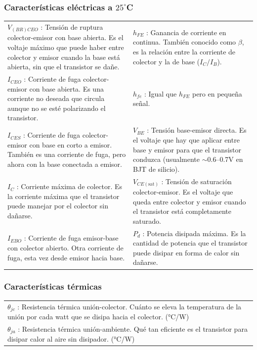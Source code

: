 \documentclass[chaptersright]{informeutn}
\begin{document}
\subsubsection{Características eléctricas a $25^\circ$C }

\begin{tabular}{p{7cm} p{7cm}}
    $V_{(BR)CEO}$ : Tensión de ruptura colector-emisor con base abierta. Es el voltaje máximo que puede haber entre colector y emisor cuando la base está abierta, sin que el transistor se dañe. &
    $h_{FE}$ : Ganancia de corriente en continua. También conocido como $\beta$, es la relación entre la corriente de colector y la de base ($I_C/I_B$). \\
    
    $I_{CEO}$ : Corriente de fuga colector-emisor con base abierta. Es una corriente no deseada que circula aunque no se esté polarizando el transistor. &
    $h_{fe}$ : Igual que $h_{FE}$ pero en pequeña señal. \\
    
    $I_{CES}$ : Corriente de fuga colector-emisor con base en corto a emisor. También es una corriente de fuga, pero ahora con la base conectada a emisor. &
    $V_{BE}$ : Tensión base-emisor directa. Es el voltaje que hay que aplicar entre base y emisor para que el transistor conduzca (usualmente $\sim$0.6–0.7V en BJT de silicio). \\
    
    $I_C$ : Corriente máxima de colector. Es la corriente máxima que el transistor puede manejar por el colector sin dañarse. &
    $V_{CE(\text{sat})}$ : Tensión de saturación colector-emisor. Es el voltaje que queda entre colector y emisor cuando el transistor está completamente saturado. \\
    
    $I_{EBO}$ : Corriente de fuga emisor-base con colector abierto. Otra corriente de fuga, esta vez desde emisor hacia base. &
    $P_d$ : Potencia disipada máxima. Es la cantidad de potencia que el transistor puede disipar en forma de calor sin dañarse. \\
\end{tabular}

\vspace{1em}
\subsubsection{Características térmicas}

\begin{tabular}{p{14cm}}
    $\theta_{jc}$ : Resistencia térmica unión-colector. Cuánto se eleva la temperatura de la unión por cada watt que se disipa hacia el colector. (°C/W) \\
    $\theta_{ja}$ : Resistencia térmica unión-ambiente. Qué tan eficiente es el transistor para disipar calor al aire sin disipador. (°C/W) \\
\end{tabular}
\end{document}
